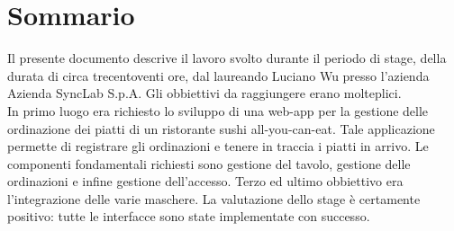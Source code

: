 
\cleardoublepage
{}
{}
\begingroup
\let\clearpage\relax
\let\cleardoublepage\relax
\let\cleardoublepage\relax

\chapter*{Sommario}

Il presente documento descrive il lavoro svolto durante il periodo di stage, della durata di circa trecentoventi ore, dal laureando Luciano Wu presso l'azienda Azienda SyncLab S.p.A.
Gli obbiettivi da raggiungere erano molteplici.\\
In primo luogo era richiesto lo sviluppo di una web-app per la gestione delle ordinazione dei piatti di un ristorante sushi all-you-can-eat.
Tale applicazione permette di registrare gli ordinazioni e tenere in traccia i piatti in arrivo.
Le componenti fondamentali richiesti sono gestione del tavolo, gestione delle ordinazioni e infine gestione dell'accesso.
Terzo ed ultimo obbiettivo era l'integrazione delle varie maschere.
La valutazione dello stage è certamente positivo: tutte le interfacce sono state implementate con successo.
%
%

\endgroup			

\vfill

